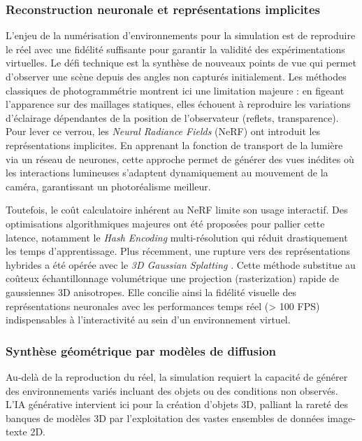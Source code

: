 \subsubsection{Reconstruction neuronale et représentations implicites}
L'enjeu de la numérisation d'environnements pour la simulation est de reproduire le réel avec une fidélité suffisante pour garantir la validité des expérimentations virtuelles. Le défi technique est la synthèse de nouveaux points de vue qui permet d'observer une scène depuis des angles non capturés initialement. Les méthodes classiques de photogrammétrie \cite{seitz_comparison_2006} montrent ici une limitation majeure : en figeant l'apparence sur des maillages statiques, elles échouent à reproduire les variations d'éclairage dépendantes de la position de l'observateur (reflets, transparence). Pour lever ce verrou, les \textit{Neural Radiance Fields} (NeRF) \cite{mildenhall_nerf_2022} ont introduit les représentations implicites. En apprenant la fonction de transport de la lumière via un réseau de neurones, cette approche permet de générer des vues inédites où les interactions lumineuses s'adaptent dynamiquement au mouvement de la caméra, garantissant un photoréalisme meilleur.

Toutefois, le coût calculatoire inhérent au NeRF limite son usage interactif. Des optimisations algorithmiques majeures ont été proposées pour pallier cette latence, notamment le \textit{Hash Encoding} multi-résolution \cite{muller_instant_2022} qui réduit drastiquement les temps d'apprentissage. Plus récemment, une rupture vers des représentations hybrides a été opérée avec le \textit{3D Gaussian Splatting} \cite{kerbl_3d_2023}. Cette méthode substitue au coûteux échantillonnage volumétrique une projection (rasterization) rapide de gaussiennes 3D anisotropes. Elle concilie ainsi la fidélité visuelle des représentations neuronales avec les performances temps réel (> 100 FPS) indispensables à l'interactivité au sein d'un environnement virtuel.


\subsubsection{Synthèse géométrique par modèles de diffusion}
Au-delà de la reproduction du réel, la simulation requiert la capacité de générer des environnements variés incluant des objets ou des conditions non observés. L'IA générative intervient ici pour la création d'objets 3D, palliant la rareté des banques de modèles 3D par l'exploitation des vastes ensembles de données image-texte 2D.

